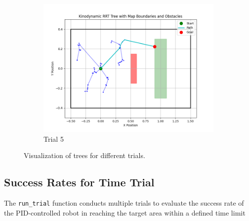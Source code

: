 \documentclass[12pt]{article}
\begin{document}
\begin{figure}[h!]
    \begin{subfigure}{0.45\textwidth}
        \centering
        \includegraphics[width=\textwidth]{./images/tree5.png}
        \caption{Trial 5}
        \label{fig:tree_5}
    \end{subfigure}

    \caption{Visualization of trees for different trials.}
    \label{fig:trials}
\end{figure}

\subsection{Success Rates for Time Trial}

The \texttt{run\_trial} function conducts multiple trials to evaluate the success rate of the PID-controlled robot in reaching the target area within a defined time limit
\end{document}
